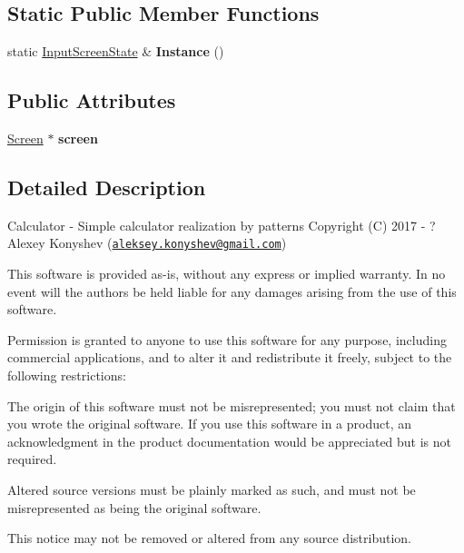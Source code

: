\subsection*{Static Public Member Functions}
\begin{DoxyCompactItemize}
\item 
\hypertarget{class_input_screen_state_acc5cad3f3defa6541ecea1921e2ce32e}{}static \hyperlink{class_input_screen_state}{Input\+Screen\+State} \& {\bfseries Instance} ()\label{class_input_screen_state_acc5cad3f3defa6541ecea1921e2ce32e}

\end{DoxyCompactItemize}
\subsection*{Public Attributes}
\begin{DoxyCompactItemize}
\item 
\hypertarget{class_input_screen_state_acd38c9445389e3995fec2c4f9763637b}{}\hyperlink{class_screen}{Screen} $\ast$ {\bfseries screen}\label{class_input_screen_state_acd38c9445389e3995fec2c4f9763637b}

\end{DoxyCompactItemize}


\subsection{Detailed Description}
Calculator -\/ Simple calculator realization by patterns Copyright (C) 2017 -\/ ? Alexey Konyshev (\href{mailto:aleksey.konyshev@gmail.com}{\tt aleksey.\+konyshev@gmail.\+com})

This software is provided \textquotesingle{}as-\/is\textquotesingle{}, without any express or implied warranty. In no event will the authors be held liable for any damages arising from the use of this software.

Permission is granted to anyone to use this software for any purpose, including commercial applications, and to alter it and redistribute it freely, subject to the following restrictions\+:


\begin{DoxyEnumerate}
\item The origin of this software must not be misrepresented; you must not claim that you wrote the original software. If you use this software in a product, an acknowledgment in the product documentation would be appreciated but is not required.
\item Altered source versions must be plainly marked as such, and must not be misrepresented as being the original software.
\item This notice may not be removed or altered from any source distribution. 
\end{DoxyEnumerate}

